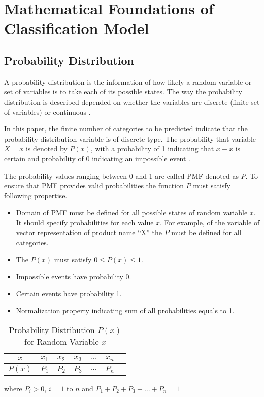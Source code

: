 \chapter{Mathematical Foundations of Classification Model}



\section{Probability Distribution}

A probability distribution is the information of how likely a random variable or set of variables is to take each of its possible states. The way the probability distribution is described depended on whether the variables are discrete (finite set of variables) or continuous \parencite[Page 54]{Goodfellow-et-al-2016}. 

In this paper, the finite number of categories to be predicted indicate that the probability distribution variable is of discrete type.  The probability that variable $X = x$ is denoted by $ P(x) $, with a probability of 1 indicating that $x-x$ is certain and probability of 0 indicating an impossible event \parencite[Page 55]{Goodfellow-et-al-2016}.


The probability values ranging between 0  and 1 are called \acf{PMF} denoted as $ P $. To ensure that \acs*{PMF} provides valid probabilities the function $P$ must satisfy following propertise.


\begin{itemize}
    \item Domain of PMF must be defined for all possible states of random variable $x$. It should specify probabilities for each value $x$. For example, of the variable of vector representation of product name ``X'' the $P$ must be defined for all categories.
    \item The $ P(x) $ must satisfy $0 \leq  P(x) \leq  1$.
    \item Impossible events have probability 0.
    \item Certain events have probability 1.
    \item Normalization property indicating sum of all probabilities equals to 1.
\end{itemize}


\begin{table}[H]
    \centering
    \begin{tabular}{ccccccc}
        \hline
        $x$ & $x_1$ & $x_2$ & $x_3$ & $\dots$ & $x_n$ \\
        \hline
        $P(x)$ & $P_1$ & $P_2$ & $P_3$ & $\dots$ & $P_n$ \\
        \hline
    \end{tabular}
    \caption{Probability Distribution $P(x)$ for Random Variable $x$}
    \label{tab:probability-distribution}
\end{table}

where \(P_i > 0\), \(i=1\) to \(n\) and \(P_1 + P_2 + P_3 + \ldots + P_n =1\) \\